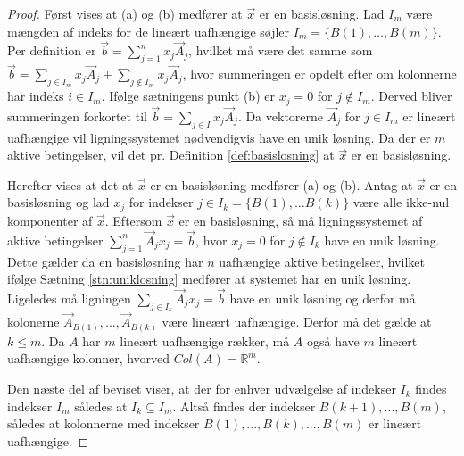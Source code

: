 \begin{proof}
Først vises at (a) og (b) medfører at $\vec{x}$ er en basisløsning.
Lad $I_m$ være mængden af indeks for de lineært uafhængige søjler  $I_m=\{B(1),\dots,B(m)\}$. Per definition er $\vec{b}=\sum_{j=1}^{n} x_j \vec{A}_j$, hvilket må være det samme som $\vec{b}=\sum_{j\in I_m} x_j \vec{A}_j+\sum_{j\notin I_m} x_j \vec{A}_j$, hvor summeringen er opdelt efter om kolonnerne har indeks $i \in I_m$. 
Ifølge sætningens punkt (b) er $x_j=0$ for $j \notin I_m$. Derved bliver summeringen forkortet til $\vec{b}=\sum_{j\in I}x_j \vec{A}_j$. Da vektorerne $\vec{A}_j$ for $j \in I_m$ er lineært uafhængige vil ligningssystemet nødvendigvis have en unik løsning. Da der er $m$ aktive betingelser, vil det pr. Definition \ref{def:basislosning} at $\vec{x}$ er en basisløsning.

% 

Herefter vises at det at $\vec{x}$ er en basisløsning medfører (a) og (b). Antag at $\vec{x}$ er en basisløsning og lad $x_j$ for indekser $j \in I_k=\{B(1),\dots B(k)\}$ være alle ikke-nul komponenter af $\vec{x}$.
Eftersom $\vec{x}$ er en basisløsning, så må ligningssystemet af aktive betingelser $\sum_{j=1}^{n}\vec{A}_jx_j=\vec{b}$, hvor $x_j=0$ for $j\notin I_k$ have en unik løsning. Dette gælder da en basisløsning har $n$ uafhængige aktive betingelser, hvilket ifølge Sætning \ref{stn:uniklosning} medfører at systemet har en unik løsning. 
Ligeledes må ligningen $\sum_{j \in I_k}\vec{A}_jx_j=\vec{b}$ have en unik løsning og derfor må kolonerne $\vec{A}_{B(1)}, ..., \vec{A}_{B(k)}$ være lineært uafhængige. Derfor må det gælde at $k \leq m$. %
Da $A$ har $m$ lineært uafhængige rækker, må $A$ også have $m$ lineært uafhængige kolonner, hvorved $Col(A)=\mathds{R}^m$.

Den næste del af beviset viser, at der for enhver udvælgelse af indekser $I_k$ findes indekser $I_m$ således at $I_k \subseteq I_m$. 
Altså findes der indekser $B(k+1),...,B(m)$, således at kolonnerne med indekser $B(1),...,B(k),...,B(m)$ er lineært uafhængige. 


\end{proof}
